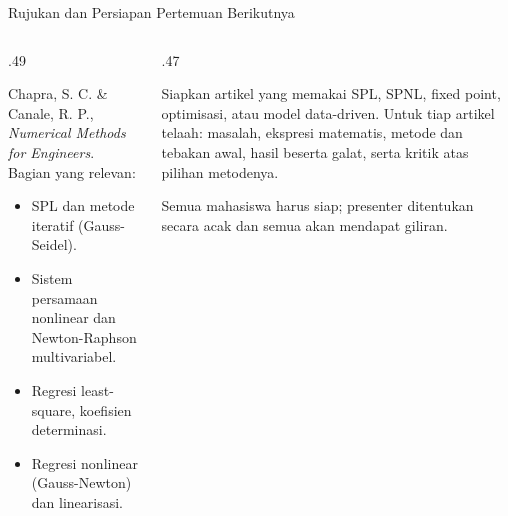 \documentclass[aspectratio=169,10pt]{beamer}
\begin{document}
\begin{frame}{Rujukan dan Persiapan Pertemuan Berikutnya}
\scriptsize
\begin{columns}[T,totalwidth=\textwidth]
\begin{column}{.49\textwidth}
\begin{bluebox}
Chapra, S. C. \& Canale, R. P., \emph{Numerical Methods for Engineers}. Bagian yang relevan:
\begin{itemize}\setlength\itemsep{2pt}
\item SPL dan metode iteratif (Gauss-Seidel).
\item Sistem persamaan nonlinear dan Newton-Raphson multivariabel.
\item Regresi least-square, koefisien determinasi.
\item Regresi nonlinear (Gauss-Newton) dan linearisasi.
\end{itemize}
\end{bluebox}
\end{column}
\begin{column}{.47\textwidth}
\begin{orangebox}
Siapkan artikel yang memakai SPL, SPNL, fixed point, optimisasi, atau model data-driven. Untuk tiap artikel telaah: masalah, ekspresi matematis, metode dan tebakan awal, hasil beserta galat, serta kritik atas pilihan metodenya.
\end{orangebox}
\begin{purplebox}
Semua mahasiswa harus siap; presenter ditentukan secara acak dan semua akan mendapat giliran.
\end{purplebox}
\end{column}
\end{columns}
\end{frame}
\end{document}
